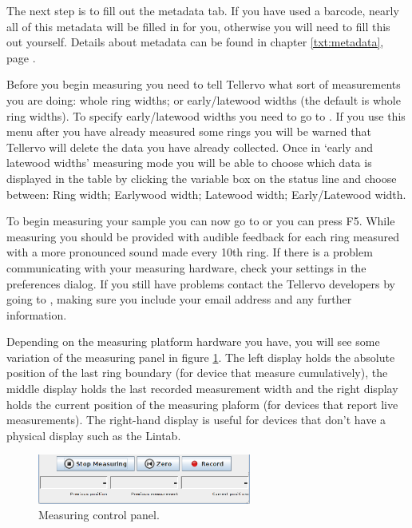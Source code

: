 The next step is to fill out the metadata tab. If you have used a barcode, nearly all of this metadata will be filled in for you, otherwise you will need to fill this out yourself. Details about metadata can be found in chapter \ref{txt:metadata}, page \pageref{txt:metadata}.

Before you begin measuring you need to tell Tellervo what sort of measurements you are doing: whole ring widths; or early/latewood widths (the default is whole ring widths).  To specify early/latewood widths you need to go to .  If you use this menu after you have already measured some rings you will be warned that Tellervo will delete the data you have already collected.  Once in `early and latewood widths' measuring mode you will be able to choose which data is displayed in the table by clicking the variable box on the status line and choose between: Ring width; Earlywood width; Latewood width; Early/Latewood width.

To begin measuring your sample you can now go to  or you can press F5. While measuring you should be provided with audible feedback for each ring measured with a more pronounced sound made every 10th ring. If there is a problem communicating with your measuring hardware, check your settings in the preferences dialog. If you still have problems contact the Tellervo developers by going to , making sure you include your email address and any further information.

Depending on the measuring platform hardware you have, you will see some variation of the measuring panel in figure \ref{fig:measurepanel}. The left display holds the absolute position of the last ring boundary (for device that measure cumulatively), the middle display holds the last recorded measurement width and the right display holds the current position of the measuring plaform (for devices that report live measurements).  The right-hand display is useful for devices that don't have a physical display such as the Lintab. 

\begin{figure}
  \begin{center}
    \includegraphics[width=70mm]{Images/measurepanel.png}
  \end{center}
  \caption{Measuring control panel.}
  \label{fig:measurepanel}
\end{figure}


